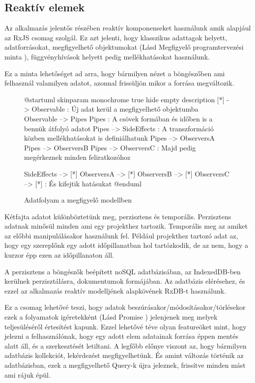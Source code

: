 \subsection{Reaktív elemek}

Az alkalmazás jelentős részében reaktív komponenseket használunk amik alapjául az RxJS \cite{RxJS} csomag szolgál. Ez azt jelenti, hogy klasszikus adattagok helyett, adatforrásokat, megfigyelhető objektumokat (Lásd Megfigyelő programtervezési minta \cite{ObserverPattern}), függvényhívások helyett pedig mellékhatásokat használunk.

Ez a minta lehetőséget ad arra, hogy bármilyen nézet a böngészőben ami felhasznál valamilyen adatot, azonnal frissüljön mikor a forrása megváltozik.

\begin{figure}[h!]
	\centering
	\begin{plantuml}
		@startuml
		skinparam monochrome true
		hide empty description
		[*] -> Observable : Új adat kerül a megfigyelhető objektumba
		Observable --> Pipes
		Pipes : A csövek formában és időben is  a bennük átfolyó adatot
		Pipes --> SideEffects : A transzformáció közben mellékhatásokat is definiálhatunk
		Pipes --> ObserversA
		Pipes --> ObserversB
		Pipes --> ObserversC : Majd pedig megérkeznek minden feliratkozóhoz

		SideEffects  --> [*]
		ObserversA --> [*]
		ObserversB --> [*]
		ObserversC --> [*] : És kifejtik hatásukat
		@enduml
	\end{plantuml}
	\caption{Adatfolyam a megfigyelő modellben}
	\label{fig:observer-pattern}
\end{figure}

Kétfajta adatot különböztetünk meg, perzisztens és temporális. Perzisztens adatnak minősül minden ami egy projekthez tartozik. Temporális meg az amiket az előbbi manipulálásakor használunk fel. Például projekthez tartozó adat az, hogy egy szereplőnk egy adott időpillanatban hol tartózkodik, de az nem, hogy a kurzor épp ezen az időpillanaton áll.

A perzisztens a böngészők beépített noSQL adatbázisában, az IndexedDB-ben kerülnek perzisztálásra, dokumentumok formájában. Az adatbázis elérésehez, és ezzel az alkalmazás reaktív modelljének alapkövének RxDB-t \cite{RxDB} használunk.

Ez a csomag lehetővé teszi, hogy adatok beszúrásakor/módosításakor/törlésekor ezek a folyamatok igéretekként (Lásd Promise \cite{Promise}) jelenjenek meg melyek teljesüléséről értesítést kapunk. Ezzel lehetővé téve olyan featureöket mint, hogy jelezni a felhasználónak, hogy egy adott elem adatainak forrása éppen mentés alatt áll, és a szerkesztését letiltani. A legfőbb előnye viszont az, hogy bármilyen adatbázis kollekciót, lekérdezést megfigyelhetünk. És amint változás történik az adatbázisban, ezek a megfigyelhető Query-k újra jeleznek, frissítve minden mást ami rájuk épül.


